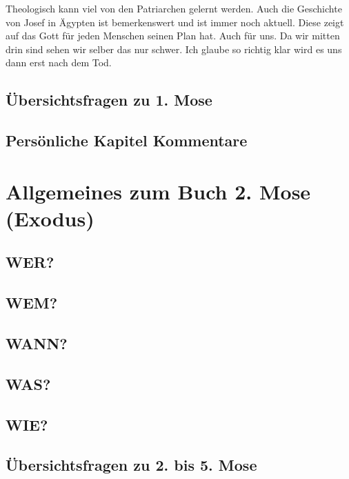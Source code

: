 Theologisch kann viel von den Patriarchen gelernt werden. Auch die Geschichte von Josef in Ägypten ist bemerkenswert und ist immer noch aktuell. Diese zeigt auf das Gott für jeden Menschen seinen Plan hat. Auch für uns. Da wir mitten drin sind sehen wir selber das nur schwer. Ich glaube so richtig klar wird es uns dann erst nach dem Tod.
\subsection{Übersichtsfragen zu 1. Mose}
    
\subsection{Persönliche Kapitel Kommentare}
    
    
    
    
    
    
\section{Allgemeines zum Buch 2. Mose (Exodus)}
\subsection{WER?}
\subsection{WEM?}
\subsection{WANN?}
\subsection{WAS?}
\subsection{WIE?}
\subsection{Übersichtsfragen zu 2. bis 5. Mose}
    
